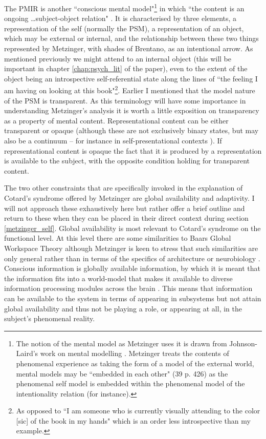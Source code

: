 The PMIR is another ``conscious mental model"\footnote{The notion of the mental model as Metzinger uses it is drawn from Johnson-Laird's work on mental modelling \cite[p. xi; 38]{metzinger2003}. Metzinger treats the contents of phenomenal experience as taking the form of a model of the external world, mental models may be ``embedded in each other" (39 p. 426) as the phenomenal self model is embedded within the phenomenal model of the intentionality relation (for instance).} in which ``the content is an ongoing \ldots subject-object relation" \cite[p. 23]{metzinger2005}. It is characterised by three elements, a representation of the self (normally the PSM), a representation of an object, which may be external or internal, and the relationship between these two things represented by Metzinger, with shades of Brentano, as an intentional arrow. As mentioned previously we might attend to an internal object (this will be important in chapter \ref{chap:psych_lit} of the paper), even to the extent of the object being an introspective self-referential state along the lines of ``the feeling I am having on looking at this book"\footnote{As opposed to ``I am someone who is currently visually attending to the color [sic] of the book in my hands" \cite[p. 23]{metzinger2005} which is an order less introspective than my example.}.
Earlier I mentioned that the model nature of the PSM is transparent. As this terminology will have some importance in understanding Metzinger's analysis it is worth a little exposition on transparency as a property of mental content. Representational content can be either transparent or opaque (although these are not exclusively binary states, but may also be a continuum – for instance in self-presentational contexts \cite[p. 332]{metzinger2003}). If representational content is opaque the fact that it is produced by a representation is available to the subject, with the opposite condition holding for transparent content.

The two other constraints that are specifically invoked in the explanation of Cotard's syndrome offered by Metzinger are global availability and adaptivity. I will not approach these exhaustively here but rather offer a brief outline and return to these when they can be placed in their direct context during section \ref{metzinger_self}. Global availability is most relevant to Cotard's syndrome on the functional level. At this level there are some similarities to Baars Global Workspace Theory \cite{baars1988} although Metzinger is keen to stress that such similarities are only general rather than in terms of the specifics of architecture or neurobiology \cite[p. 120]{metzinger2003}. Conscious information is globally available information, by which it is meant that the information fits into a world-model that makes it available to diverse information processing modules across the brain \cite[p. 121]{metzinger2003}. This means that information can be available to the system in terms of appearing in subsystems but not attain global availability and thus not be playing a role, or appearing at all, in the subject's phenomenal reality.

